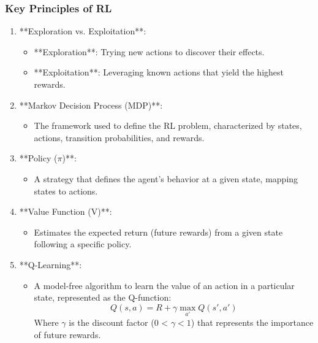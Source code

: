 \documentclass[aspectratio=169]{beamer}
\begin{document}
\begin{frame}[fragile]
    \frametitle{Key Principles of RL}
    \begin{enumerate}
        \item **Exploration vs. Exploitation**:
            \begin{itemize}
                \item **Exploration**: Trying new actions to discover their effects.
                \item **Exploitation**: Leveraging known actions that yield the highest rewards.
            \end{itemize}

        \item **Markov Decision Process (MDP)**:
            \begin{itemize}
                \item The framework used to define the RL problem, characterized by states, actions, transition probabilities, and rewards.
            \end{itemize}

        \item **Policy (\(\pi\))**:
            \begin{itemize}
                \item A strategy that defines the agent's behavior at a given state, mapping states to actions.
            \end{itemize}

        \item **Value Function (V)**:
            \begin{itemize}
                \item Estimates the expected return (future rewards) from a given state following a specific policy.
            \end{itemize}

        \item **Q-Learning**:
            \begin{itemize}
                \item A model-free algorithm to learn the value of an action in a particular state, represented as the Q-function:
                \begin{equation}
                    Q(s, a) = R + \gamma \max_{a'} Q(s', a')
                \end{equation}
                Where \( \gamma \) is the discount factor (0 < \( \gamma < 1 \)) that represents the importance of future rewards.
            \end{itemize}
    \end{enumerate}
\end{frame}
\end{document}
